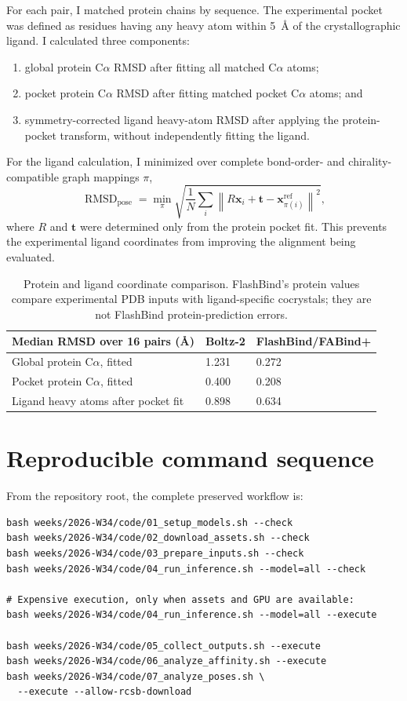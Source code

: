 \documentclass[11pt]{article}
\begin{document}
For each pair, I matched protein chains by sequence. The experimental pocket
was defined as residues having any heavy atom within 5~\AA{} of the
crystallographic ligand. I calculated three components:
\begin{enumerate}
  \item global protein C$\alpha$ RMSD after fitting all matched C$\alpha$ atoms;
  \item pocket protein C$\alpha$ RMSD after fitting matched pocket C$\alpha$
  atoms; and
  \item symmetry-corrected ligand heavy-atom RMSD after applying the
  protein-pocket transform, without independently fitting the ligand.
\end{enumerate}

For the ligand calculation, I minimized over complete bond-order- and
chirality-compatible graph mappings $\pi$,
\[
 \operatorname{RMSD}_{\mathrm{pose}}
 =\min_{\pi}
 \sqrt{\frac{1}{N}\sum_i
 \left\|R\mathbf{x}_i+\mathbf{t}
 -\mathbf{x}^{\mathrm{ref}}_{\pi(i)}\right\|^2},
\]
where $R$ and $\mathbf{t}$ were determined only from the protein pocket fit.
This prevents the experimental ligand coordinates from improving the
alignment being evaluated.

\begin{table}[H]
\centering
\small
\begin{tabular}{L{2.65in}C{1.35in}C{1.65in}}
\toprule
Median RMSD over 16 pairs (\AA) & Boltz-2 & FlashBind/FABind+ \\
\midrule
Global protein C$\alpha$, fitted & 1.231 & 0.272 \\
Pocket protein C$\alpha$, fitted & 0.400 & 0.208 \\
Ligand heavy atoms after pocket fit & 0.898 & 0.634 \\
\bottomrule
\end{tabular}
\caption{Protein and ligand coordinate comparison. FlashBind's protein values
compare experimental PDB inputs with ligand-specific cocrystals; they are not
FlashBind protein-prediction errors.}
\end{table}

\section{Reproducible command sequence}

From the repository root, the complete preserved workflow is:
\begin{verbatim}
bash weeks/2026-W34/code/01_setup_models.sh --check
bash weeks/2026-W34/code/02_download_assets.sh --check
bash weeks/2026-W34/code/03_prepare_inputs.sh --check
bash weeks/2026-W34/code/04_run_inference.sh --model=all --check

# Expensive execution, only when assets and GPU are available:
bash weeks/2026-W34/code/04_run_inference.sh --model=all --execute

bash weeks/2026-W34/code/05_collect_outputs.sh --execute
bash weeks/2026-W34/code/06_analyze_affinity.sh --execute
bash weeks/2026-W34/code/07_analyze_poses.sh \
  --execute --allow-rcsb-download
\end{verbatim}
\end{document}

